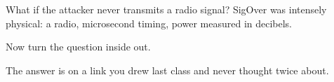 \begin{frame}{What if the attacker never transmits a radio signal?}
  \vspace{0.8em}
  \large
  SigOver was intensely physical: a radio, microsecond timing, power measured
  in decibels.

  \vspace{1.0em}
  \normalsize
  Now turn the question inside out.

  \vspace{0.8em}

  \vspace{0.6em}
  \small
  \textcolor{softgray}{The answer is on a link you drew last class and never
  thought twice about.}
\end{frame}


